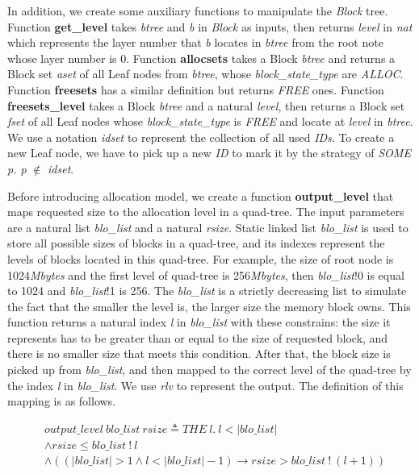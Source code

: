 In addition, we create some auxiliary functions to manipulate the \textsl{Block} tree. Function \textbf{get\_level} takes \emph{btree} and \emph{b} in \emph{Block} as inputs, then returns \emph{level} in \emph{nat} which represents the layer number that \emph{b} locates in \emph{btree} from the root note whose layer number is 0. Function \textbf{allocsets} takes a Block \emph{btree} and returns a Block set \emph{aset} of all Leaf nodes from \emph{btree}, whose \emph{block\_state\_type} are \emph{ALLOC}. Function \textbf{freesets} has a similar definition but returns \emph{FREE} ones. Function \textbf{freesets\_level} takes a Block \emph{btree} and a natural \emph{level}, then returns a Block set \emph{fset} of all Leaf nodes whose \emph{block\_state\_type} is \emph{FREE} and locate at \emph{level} in \emph{btree}. We use a notation \emph{idset} to represent the collection of all used \emph{IDs}. To create a new Leaf node, we have to pick up a new \emph{ID} to mark it by the strategy of \emph{SOME p. p} $\notin$ \emph{idset}.

Before introducing allocation model, we create a function \textbf{output\_level} that maps requested size to the allocation level in a quad-tree. The input parameters are a natural list \emph{blo\_list} and a natural \emph{rsize}. Static linked list \emph{blo\_list} is used to store all possible sizes of blocks in a quad-tree, and its indexes represent the levels of blocks located in this quad-tree. For example, the size of root node is 1024\emph{Mbytes} and the first level of quad-tree is 256\emph{Mbytes}, then \emph{blo\_list}!0 is equal to 1024 and \emph{blo\_list}!1 is 256. The \emph{blo\_list} is a strictly decreasing list to simulate the fact that the smaller the level is, the larger size the memory block owns. This function returns a natural index \emph{l} in \emph{blo\_list} with these constrains: the size it represents has to be greater than or equal to the size of requested block, and there is no smaller size that meets this condition. After that, the block size is picked up from \emph{blo\_list}, and then mapped to the correct level of the quad-tree by the index \emph{l} in \emph{blo\_list}. We use \emph{rlv} to represent the output. The definition of this mapping is as follows.

\begin{definition} 
\label{mostsuitable}
\end{definition}
\vspace{-27pt}
{\footnotesize
\begin{align*}
&output\_level\ blo\_list\ rsize \triangleq THE\ l.\ l < \vert blo\_list \vert \\
&\wedge rsize \le blo\_list\ !\ l \\
&\wedge ((\vert blo\_list \vert > 1 \wedge l < \vert blo\_list \vert - 1) \longrightarrow rsize > blo\_list\ !\ (l+1))
\end{align*}
}
\vspace{-17pt}

